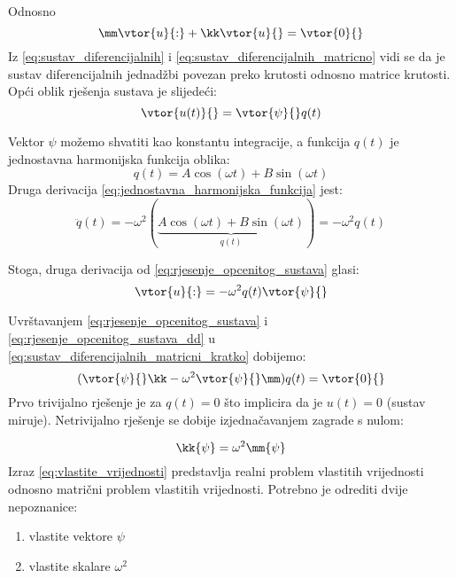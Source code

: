 Odnosno
\begin{equation}\label{eq:sustav_diferencijalnih_matricni_kratko}
    \mm\vtor{u}{:}+\kk\vtor{u}{}=\vtor{0}{}
\end{equation}
Iz \eqref{eq:sustav_diferencijalnih} i \eqref{eq:sustav_diferencijalnih_matricno}
vidi se da je sustav diferencijalnih jednadžbi povezan preko krutosti odnosno
matrice krutosti. Opći oblik rješenja sustava je slijedeći:
\begin{equation}\label{eq:rjesenje_opcenitog_sustava}
    \vtor{u(t)}{} = \vtor{\psi}{}q(t)
\end{equation}

Vektor $\psi$ možemo shvatiti kao konstantu integracije, a funkcija $q(t)$ je
jednostavna harmonijska funkcija oblika:
\begin{equation}\label{eq:jednostavna_harmonijska_funkcija}
    q(t)=A\cos(\omega t) + B\sin(\omega t)
\end{equation}
Druga derivacija \eqref{eq:jednostavna_harmonijska_funkcija} jest:
\begin{equation}\label{eq:jednostavna_harmonijska_funkcija_dd}
    \ddot{q}(t)=-\omega^2(
    \underbrace{
        A\cos(\omega t) + B\sin(\omega t)
    }_{\text{$q(t)$}}
    )
    =-\omega^2q(t)
\end{equation}

Stoga, druga derivacija od \eqref{eq:rjesenje_opcenitog_sustava} glasi:
\begin{equation}\label{eq:rjesenje_opcenitog_sustava_dd}
    \vtor{u}{:}=-\omega^2q(t)\vtor{\psi}{}
\end{equation}

Uvrštavanjem \eqref{eq:rjesenje_opcenitog_sustava} i \eqref{eq:rjesenje_opcenitog_sustava_dd}
u \eqref{eq:sustav_diferencijalnih_matricni_kratko} dobijemo:
\begin{equation}
    (\vtor{\psi}{}\kk-\omega^2\vtor{\psi}{}\mm)q(t)=\vtor{0}{}
\end{equation}
Prvo trivijalno rješenje je za $q(t)=0$ što implicira da je $u(t)=0$ (sustav
miruje). Netrivijalno rješenje se dobije izjednačavanjem zagrade s nulom:

\begin{equation}\label{eq:vlastite_vrijednosti}
    \kk\{\psi\}=\omega^2\mm\{\psi\}
\end{equation}
Izraz \eqref{eq:vlastite_vrijednosti} predstavlja realni problem vlastitih
vrijednosti odnosno matrični problem vlastitih vrijednosti. Potrebno je odrediti
dvije nepoznanice: 
\begin{enumerate}
    \item vlastite vektore $\psi$
    \item vlastite skalare $\omega^2$
\end{enumerate}

